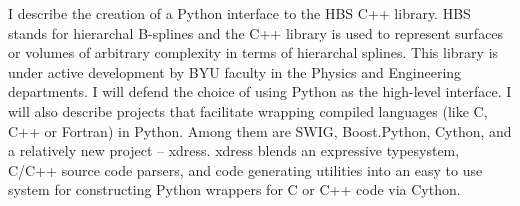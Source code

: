 I describe the creation of a Python interface to the HBS C++ library. HBS stands for hierarchal B-splines and the C++ library is used to represent surfaces or volumes of arbitrary complexity in terms of hierarchal splines. This library is under active development by BYU faculty in the Physics and Engineering departments. I will defend the choice of using Python as the high-level interface. I will also describe projects that facilitate wrapping compiled languages (like C, C++ or Fortran) in Python. Among them are SWIG, Boost.Python, Cython, and a relatively new project -- xdress. xdress blends an expressive typesystem, C/C++ source code parsers, and code generating utilities into an easy to use system for constructing Python wrappers for C or C++ code via Cython.

